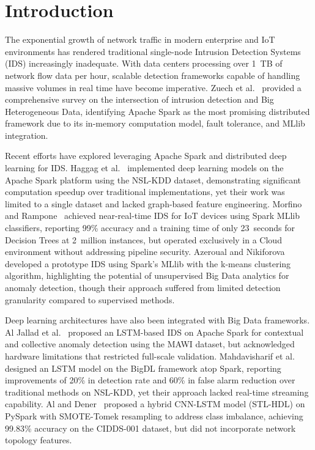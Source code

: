 \documentclass[conference]{IEEEtran}
\begin{document}
\section{Introduction}

The exponential growth of network traffic in modern enterprise and IoT environments has rendered traditional single-node Intrusion Detection Systems (IDS) increasingly inadequate. With data centers processing over 1~TB of network flow data per hour, scalable detection frameworks capable of handling massive volumes in real time have become imperative. Zuech et al.~\cite{b1} provided a comprehensive survey on the intersection of intrusion detection and Big Heterogeneous Data, identifying Apache Spark as the most promising distributed framework due to its in-memory computation model, fault tolerance, and MLlib integration.

Recent efforts have explored leveraging Apache Spark and distributed deep learning for IDS. Haggag et al.~\cite{b2} implemented deep learning models on the Apache Spark platform using the NSL-KDD dataset, demonstrating significant computation speedup over traditional implementations, yet their work was limited to a single dataset and lacked graph-based feature engineering. Morfino and Rampone~\cite{b3} achieved near-real-time IDS for IoT devices using Spark MLlib classifiers, reporting 99\% accuracy and a training time of only 23~seconds for Decision Trees at 2~million instances, but operated exclusively in a Cloud environment without addressing pipeline security. Azeroual and Nikiforova~\cite{b4} developed a prototype IDS using Spark's MLlib with the k-means clustering algorithm, highlighting the potential of unsupervised Big Data analytics for anomaly detection, though their approach suffered from limited detection granularity compared to supervised methods.

Deep learning architectures have also been integrated with Big Data frameworks. Al Jallad et al.~\cite{b5} proposed an LSTM-based IDS on Apache Spark for contextual and collective anomaly detection using the MAWI dataset, but acknowledged hardware limitations that restricted full-scale validation. Mahdavisharif et al.~\cite{b6} designed an LSTM model on the BigDL framework atop Spark, reporting improvements of 20\% in detection rate and 60\% in false alarm reduction over traditional methods on NSL-KDD, yet their approach lacked real-time streaming capability. Al and Dener~\cite{b7} proposed a hybrid CNN-LSTM model (STL-HDL) on PySpark with SMOTE-Tomek resampling to address class imbalance, achieving 99.83\% accuracy on the CIDDS-001 dataset, but did not incorporate network topology features.
\end{document}
